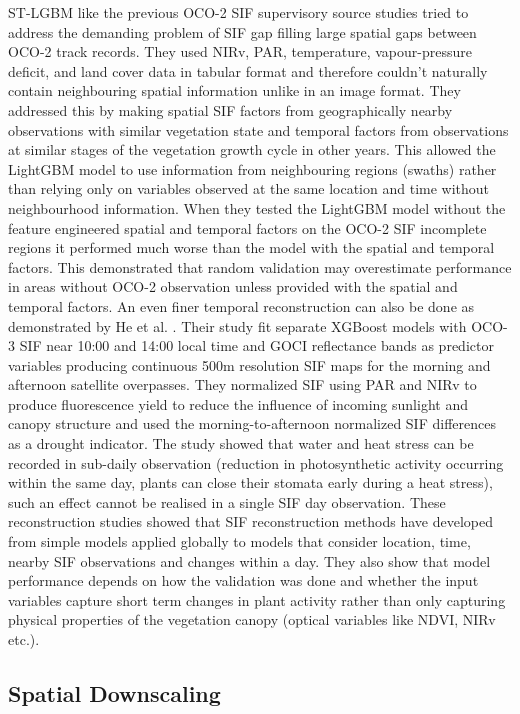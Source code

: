 ST-LGBM \cite{shen2022spatiotemporal} like the previous OCO-2 SIF supervisory source studies tried to address the demanding problem of SIF gap filling large spatial gaps between OCO-2 track records. They used NIRv, PAR, temperature, vapour-pressure deficit, and land cover data in tabular format and therefore couldn't naturally contain neighbouring spatial information unlike in an image format. They addressed this by making spatial SIF factors from geographically nearby observations with similar vegetation state and temporal factors from observations at similar stages of the vegetation growth cycle in other years. This allowed the LightGBM model to use information from neighbouring regions (swaths) rather than relying only on variables observed at the same location and time without neighbourhood information. When they tested the LightGBM model without the feature engineered spatial and temporal factors on the OCO-2 SIF incomplete regions it performed much worse than the model with the spatial and temporal factors. This demonstrated that random validation may overestimate performance in areas without OCO-2 observation unless provided with the spatial and temporal factors. An even finer temporal reconstruction can also be done as demonstrated by He et al. \cite{he2025tracking}. Their study fit separate XGBoost models with OCO-3 SIF near 10:00 and 14:00 local time and GOCI reflectance bands as predictor variables producing continuous 500m resolution SIF maps for the morning and afternoon satellite overpasses. They normalized SIF using PAR and NIRv to produce fluorescence yield to reduce the influence of incoming sunlight and canopy structure and used the morning-to-afternoon normalized SIF differences as a drought indicator. The study showed that water and heat stress can be recorded in sub-daily observation (reduction in photosynthetic activity occurring within the same day, plants can close their stomata early during a heat stress), such an effect cannot be realised in a single SIF day observation. These reconstruction studies showed that SIF reconstruction methods have developed from simple models applied globally to models that consider location, time, nearby SIF observations and changes within a day. They also show that model performance depends on how the validation was done and whether the input variables capture short term changes in plant activity rather than only capturing physical properties of the vegetation canopy (optical variables like NDVI, NIRv etc.).  

\subsection{Spatial Downscaling}

